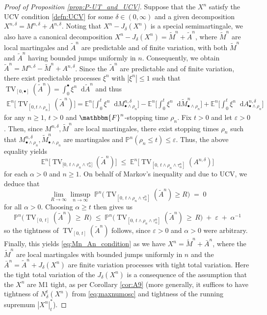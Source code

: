 \documentclass[11pt]{article}
\theoremstyle{definition}\newtheorem{example}[theorem]{Example}
\theoremstyle{definition}\newtheorem{counterexample}[theorem]{Counterexample}
\theoremstyle{definition}\newtheorem{remark}[theorem]{Remark}
\theoremstyle{definition}\newtheorem{defi}[theorem]{Definition}
\numberwithin{equation}{section}
\newcommand*\diff{\mathop{}\!\mathrm{d}}								%
\newcommand{\E}{\mathbb{E}}											%
\newcommand{\Pro}{\mathbb{P}}										%
\renewcommand{\|}{\; : \, \;}											%
\begin{document}
\begin{proof}[Proof of Proposition \ref{prop:P-UT_and_UCV}]\label{proof:P-UT_and_UCV}
	Suppose that the $X^n$ satisfy the UCV condition \eqref{defn:UCV} for some $\delta \in (0,\infty)$ and a given decomposition $X^{n,\delta}=M^{n,\delta}+A^{n,\delta}$. Noting that $X^n-J_\delta(X^n)$ is a special semimartingale, we also have a canonical decomposition $X^n-J_\delta(X^n)=\tilde{M}^n+ \tilde{A}^n$, where $\tilde{M}^n$ are local martingales and $\tilde{A}^n$ are predictable and of finite variation, with both $\tilde{M}^n$ and $\tilde{A}^n$ having bounded jumps uniformly in $n$. Consequently, we obtain $\tilde{A}^n=M^{n,\delta}- \tilde{M}^n+A^{n,\delta}$. Since the $\tilde{A}^n$ are predictable and of finite variation, there exist predictable processes $\xi^n$ with $|\xi^n|\le 1$ such that $\operatorname{TV}_{[0,\bullet]}(\tilde{A}^n)= \int_0^\bullet \xi^n \diff \tilde{A}^n$ and thus
	\begin{align*}  \E^n\bigl[\operatorname{TV}_{[0, t \wedge \rho_n]}(\tilde{A}^n)\bigr]  =  \E^n\Big[\int_0^t \!\xi^n \diff M^{n,\delta}_{\bullet \wedge \rho_n} \Big]  -  \E^n\Big[\int_0^t \!\xi^n \diff \tilde{M}^{n}_{\bullet \wedge \rho_n}\Big] +  \E^n\Big[\int_0^t \!\xi^n \diff A^{n,\delta}_{\bullet \wedge \rho_n}\Big] \label{eq:L-dom_prop_for_UCV_implies_GD}
	\end{align*}
	for any $n\ge 1$, $t>0$ and $\mathbbm{F}^n$-stopping time $\rho_n$. Fix $t>0$ and let $\varepsilon>0$. Then, since $M^{n,\delta}, \tilde{M}^n$ are local martingales, there exist stopping times $\rho_n$ such that $M^{n,\delta}_{\bullet \wedge \rho_n}, \tilde{M}^n_{\bullet \wedge \rho_n}$ are martingales and $\Pro^n(\rho_n \le t) \le \varepsilon$. Thus, the above equality yields
	$$ \E^n\bigl[\operatorname{TV}_{[0,\, t \wedge \rho_n\wedge \tau^n_\alpha\bigr]}(\tilde{A}^n)] \; \le \; \E^n\bigl[\operatorname{TV}_{[0,\, t \wedge \rho_n\wedge \tau^n_\alpha]}(A^{n,\delta})\bigr]$$
	for each $\alpha>0$ and $n\ge 1$.
	On behalf of Markov's inequality and due to UCV, we deduce that
	\[
	\lim_{R \to \infty} \limsup_{n\to \infty}\; \Pro^n \bigl(\operatorname{TV}_{[0,\, t \wedge \rho_n\wedge \tau^n_\alpha]}(\tilde{A}^n)  \ge  R \bigr) \; = \; 0
	\]
	for all $\alpha>0$. Choosing $\alpha\ge t$ then gives us
	$$ \Pro^n\bigl(\operatorname{TV}_{[0,\, t]}(\tilde{A}^n)\, \ge \, R \bigr) \; \le \; \Pro^n\bigl(\operatorname{TV}_{[0,\, t \wedge \rho_n\wedge \tau^n_\alpha]}(\tilde{A}^n)\, \ge \, R\bigr) \; + \; \varepsilon \; + \; \alpha^{-1}$$
so the tightness of $\operatorname{TV}_{[0,\, t]}(\tilde{A}^n)$ follows, since $\varepsilon>0$ and $\alpha>0$ were arbitrary. Finally, this yields \eqref{eq:Mn_An_condition} as we have $X^n=\tilde{M}^n+\bar{A}^n$, where the $\tilde{M}^n$ are local martingales with bounded jumps uniformly in $n$ and the $\bar{A}^n=\tilde{A}^n+J_\delta(X^n)$ are finite variation processes with tight total variation. Here the tight total variation of the $J_\delta(X^n)$ is a consequence of the assumption that the $X^n$ are M1 tight, as per Corollary \ref{cor:A9} (more generally, it suffices to have tightness of $N^t_\delta(X^n)$ from \eqref{eq:maxnumosc} and tightness of the running supremum $|X^n|^*_t$).
	

\end{proof}
\end{document}
